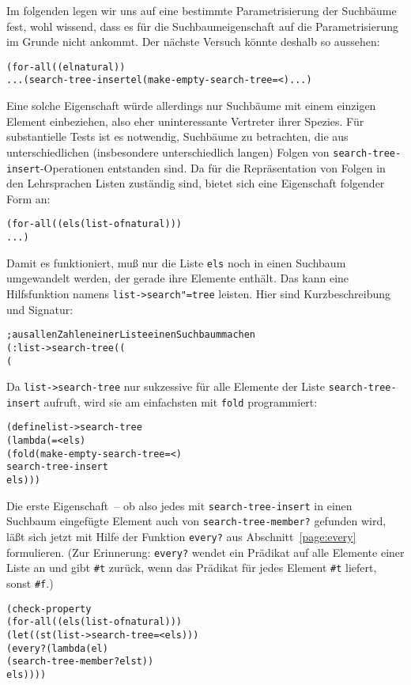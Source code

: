 Im folgenden legen wir uns auf eine bestimmte Parametrisierung der Suchbäume
fest, wohl wissend, dass es für die Suchbaumeigenschaft auf die
Parametrisierung im Grunde nicht ankommt. Der nächste Versuch
könnte deshalb so aussehen:
%
\begin{alltt}
(for-all ((el natural))
  ... (search-tree-insert el (make-empty-search-tree = <) ...)
\end{alltt}
%
Eine solche Eigenschaft würde allerdings nur Suchbäume mit einem
einzigen Element einbeziehen, also eher uninteressante Vertreter ihrer
Spezies.  Für substantielle Tests ist es notwendig, Suchbäume zu
betrachten, die aus unterschiedlichen (insbesondere unterschiedlich
langen) Folgen von \texttt{search-tree-insert}-Operationen entstanden
sind.  Da für die Repräsentation von Folgen in den Lehrsprachen Listen zuständig
sind, bietet sich eine Eigenschaft folgender Form an:
%
\begin{alltt}
(for-all ((els (list-of natural)))
  ...)
\end{alltt}
%
Damit es funktioniert, muß nur die Liste \texttt{els} noch in einen
Suchbaum umgewandelt werden, der gerade ihre Elemente enthält.  Das
kann eine Hilfsfunktion namens \texttt{list->search"=tree} leisten.
Hier sind Kurzbeschreibung und Signatur:
%
\begin{alltt}
; aus allen Zahlen einer Liste einen Suchbaum machen
(: list->search-tree ((%a %a -> boolean)
                      (%a %a -> boolean) (list-of %a) -> (search-tree-of %a)))
\end{alltt}
%
Da \texttt{list->search-tree} nur sukzessive für alle Elemente der
Liste \texttt{search-tree-insert} aufruft, wird sie am einfachsten mit
\texttt{fold} programmiert:
%
\begin{alltt}
(define list->search-tree
  (lambda (= < els)
    (fold (make-empty-search-tree = <)
          search-tree-insert
          els)))
\end{alltt}
%
Die erste Eigenschaft~-- ob also jedes mit \texttt{search-tree-insert}
in einen Suchbaum eingefügte Element auch von
\texttt{search-tree-member?} gefunden wird, läßt sich jetzt mit Hilfe
der Funktion \texttt{every?} aus Abschnitt~\ref{page:every}
formulieren.  (Zur Erinnerung: \texttt{every?} wendet ein Prädikat auf
alle Elemente einer Liste an und gibt \verb|#t| zurück, wenn das
Prädikat für jedes Element \verb|#t| liefert, sonst \verb|#f|.)
%
\begin{alltt}
(check-property
 (for-all ((els (list-of natural)))
   (let ((st (list->search-tree = < els)))
     (every? (lambda (el)
               (search-tree-member? el st))
             els))))
\end{alltt}
